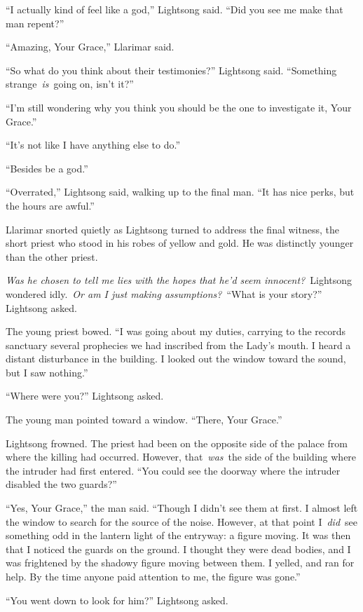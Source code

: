 “I actually kind of feel like a god,” Lightsong said. “Did you see me make that man repent?”

“Amazing, Your Grace,” Llarimar said.

“So what do you think about their testimonies?” Lightsong said. “Something strange~\textit{is}~going on, isn’t it?”

“I’m still wondering why you think you should be the one to investigate it, Your Grace.”

“It’s not like I have anything else to do.”

“Besides be a god.”

“Overrated,” Lightsong said, walking up to the final man. “It has nice perks, but the hours are awful.”

Llarimar snorted quietly as Lightsong turned to address the final witness, the short priest who stood in his robes of yellow and gold. He was distinctly younger than the other priest.

\textit{Was he chosen to tell me lies with the hopes that he’d seem innocent?}~Lightsong wondered idly.~\textit{Or am I just making assumptions?}~“What is your story?” Lightsong asked.

The young priest bowed. “I was going about my duties, carrying to the records sanctuary several prophecies we had inscribed from the Lady’s mouth. I heard a distant disturbance in the building. I looked out the window toward the sound, but I saw nothing.”

“Where were you?” Lightsong asked.

The young man pointed toward a window. “There, Your Grace.”

Lightsong frowned. The priest had been on the opposite side of the palace from where the killing had occurred. However, that~\textit{was}~the side of the building where the intruder had first entered. “You could see the doorway where the intruder disabled the two guards?”

“Yes, Your Grace,” the man said. “Though I didn’t see them at first. I almost left the window to search for the source of the noise. However, at that point I~\textit{did}~see something odd in the lantern light of the entryway: a figure moving. It was then that I noticed the guards on the ground. I thought they were dead bodies, and I was frightened by the shadowy figure moving between them. I yelled, and ran for help. By the time anyone paid attention to me, the figure was gone.”

“You went down to look for him?” Lightsong asked.

